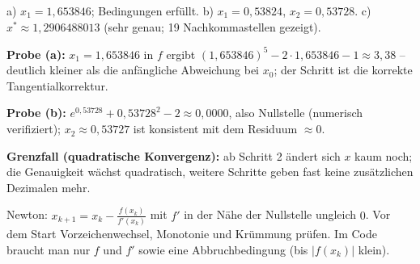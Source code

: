 \begin{ergebnis}
a) $x_1=1{,}653846$; Bedingungen erfüllt. b) $x_1=0{,}53824$,
$x_2=0{,}53728$. c) $x^*\approx1{,}2906488013$ (sehr genau; 19 Nachkommastellen
gezeigt).
\end{ergebnis}

\begin{kontrolle}
\textbf{Probe (a):} $x_1=1{,}653846$ in $f$ ergibt $(1{,}653846)^5-2\cdot
1{,}653846-1\approx3{,}38$ -- deutlich kleiner als die anfängliche
Abweichung bei $x_0$; der Schritt ist die korrekte Tangentialkorrektur.
\checkmark

\textbf{Probe (b):} $e^{0{,}53728}+0{,}53728^2-2\approx0{,}0000$, also
Nullstelle (numerisch verifiziert); $x_2\approx0{,}53727$ ist konsistent
mit dem Residuum $\approx0$. \checkmark

\textbf{Grenzfall (quadratische Konvergenz):} ab Schritt 2 ändert sich
$x$ kaum noch; die Genauigkeit wächst quadratisch, weitere Schritte geben
fast keine zusätzlichen Dezimalen mehr. \checkmark
\end{kontrolle}

\begin{merksatz}
Newton: $x_{k+1}=x_k-\frac{f(x_k)}{f'(x_k)}$ mit $f'$ in der Nähe der
Nullstelle ungleich $0$. Vor dem Start Vorzeichenwechsel, Monotonie und
Krümmung prüfen. Im Code braucht man nur $f$ und $f'$ sowie eine
Abbruchbedingung (bis $|f(x_k)|$ klein).
\end{merksatz}
